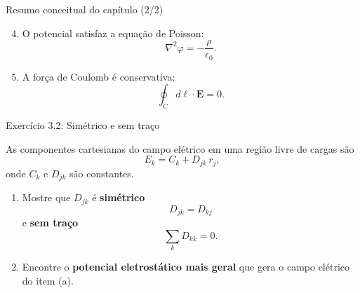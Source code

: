 \documentclass[aspectratio=169,11pt]{beamer}
\newcommand{\E}{\mathbf{E}}
\begin{document}

\begin{frame}{Resumo conceitual do capítulo (2/2)}
\begin{mybox}
\begin{enumerate}
    \setcounter{enumi}{3}

    \item O potencial satisfaz a equação de Poisson:
    \[
    \nabla^2\varphi=-\frac{\rho}{\epsilon_0}.
    \]

    \item A força de Coulomb é conservativa:
    \[
    \oint_C d\ell\cdot \E=0.
    \]
\end{enumerate}
\end{mybox}
\end{frame}


\begin{frame}{Exercício 3.2: Simétrico e sem traço}

\begin{block}{}
As componentes cartesianas do campo elétrico em uma região livre de cargas são
\[
E_k = C_k + D_{jk}\, r_j,
\]
onde \(C_k\) e \(D_{jk}\) são constantes.
\end{block}


\begin{mybox}
\begin{enumerate}
    \item[(a)] Mostre que \(D_{jk}\) é \textbf{simétrico}
    \[
    D_{jk}=D_{kj}
    \]
    e \textbf{sem traço}
    \[
    \sum_k D_{kk}=0.
    \]


    \item[(b)] Encontre o \textbf{potencial eletrostático mais geral}
    que gera o campo elétrico do item (a).
\end{enumerate}
\end{mybox}

\end{frame}
\end{document}
